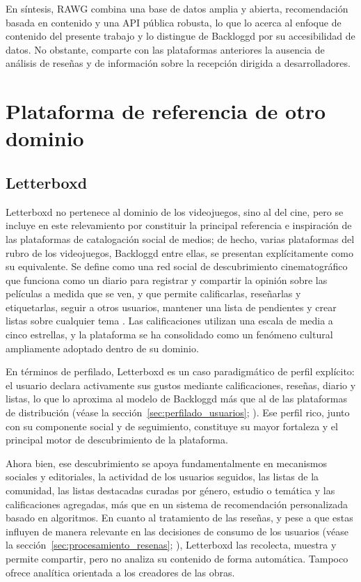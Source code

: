En síntesis, RAWG combina una base de datos amplia y abierta, recomendación basada en contenido y una API pública robusta, lo que lo acerca al enfoque de contenido del presente trabajo y lo distingue de Backloggd por su accesibilidad de datos. No obstante, comparte con las plataformas anteriores la ausencia de análisis de reseñas y de información sobre la recepción dirigida a desarrolladores.

\section{Plataforma de referencia de otro dominio}\label{sec:plataforma_referencia}

\subsection{Letterboxd}\label{subsec:letterboxd}

Letterboxd no pertenece al dominio de los videojuegos, sino al del cine, pero se incluye en este relevamiento por constituir la principal referencia e inspiración de las plataformas de catalogación social de medios; de hecho, varias plataformas del rubro de los videojuegos, Backloggd entre ellas, se presentan explícitamente como su equivalente. Se define como una red social de descubrimiento cinematográfico que funciona como un diario para registrar y compartir la opinión sobre las películas a medida que se ven, y que permite calificarlas, reseñarlas y etiquetarlas, seguir a otros usuarios, mantener una lista de pendientes y crear listas sobre cualquier tema \parencite{Letterboxd}. Las calificaciones utilizan una escala de media a cinco estrellas, y la plataforma se ha consolidado como un fenómeno cultural ampliamente adoptado dentro de su dominio.

En términos de perfilado, Letterboxd es un caso paradigmático de perfil explícito: el usuario declara activamente sus gustos mediante calificaciones, reseñas, diario y listas, lo que lo aproxima al modelo de Backloggd más que al de las plataformas de distribución (véase la sección~\ref{sec:perfilado_usuarios}; \parencite{KanojeEtAl2014}). Ese perfil rico, junto con su componente social y de seguimiento, constituye su mayor fortaleza y el principal motor de descubrimiento de la plataforma.

Ahora bien, ese descubrimiento se apoya fundamentalmente en mecanismos sociales y editoriales, la actividad de los usuarios seguidos, las listas de la comunidad, las listas destacadas curadas por género, estudio o temática y las calificaciones agregadas, más que en un sistema de recomendación personalizada basado en algoritmos. En cuanto al tratamiento de las reseñas, y pese a que estas influyen de manera relevante en las decisiones de consumo de los usuarios (véase la sección~\ref{sec:procesamiento_resenas}; \parencite{AliEtAl2016}), Letterboxd las recolecta, muestra y permite compartir, pero no analiza su contenido de forma automática. Tampoco ofrece analítica orientada a los creadores de las obras.

